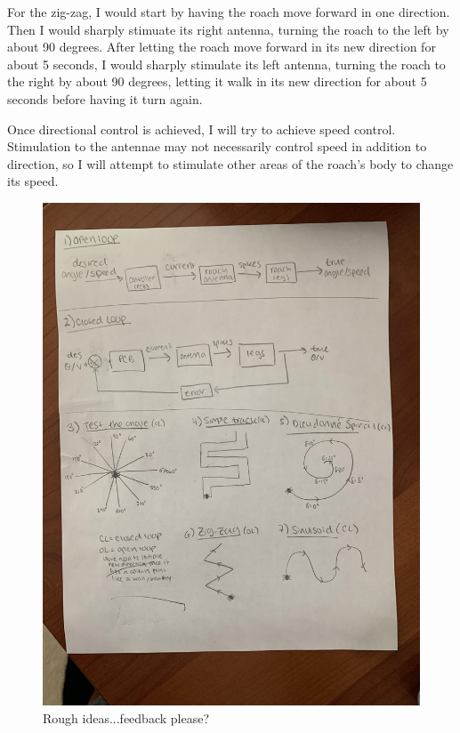 For the zig-zag, I would start by having the roach move forward in one direction. Then I would sharply stimuate its right antenna, turning the roach to the left by about 90 degrees. After letting the roach move forward in its new direction for about 5 seconds, I would sharply stimulate its left antenna, turning the roach to the right by about 90 degrees, letting it walk in its new direction for about 5 seconds before having it turn again.

Once directional control is achieved, I will try to achieve speed control. Stimulation to the antennae may not necessarily control speed in addition to direction, so I will attempt to stimulate other areas of the roach's body to change its speed.

{\begin{figure}[ht!]
\centering
\includegraphics[scale=0.1]{Figures/OpenClosedLoops.jpg}
\caption{Rough ideas...feedback please?}
\label{fig:rough}
\end{figure}}


 